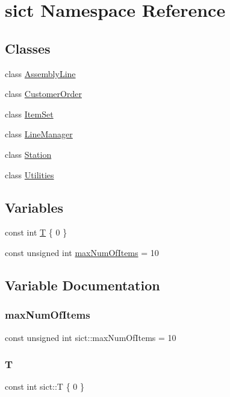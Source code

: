 \hypertarget{namespacesict}{}\section{sict Namespace Reference}
\label{namespacesict}
\subsection*{Classes}
\begin{DoxyCompactItemize}
\item 
class \mbox{\hyperlink{classsict_1_1AssemblyLine}{Assembly\+Line}}
\item 
class \mbox{\hyperlink{classsict_1_1CustomerOrder}{Customer\+Order}}
\item 
class \mbox{\hyperlink{classsict_1_1ItemSet}{Item\+Set}}
\item 
class \mbox{\hyperlink{classsict_1_1LineManager}{Line\+Manager}}
\item 
class \mbox{\hyperlink{classsict_1_1Station}{Station}}
\item 
class \mbox{\hyperlink{classsict_1_1Utilities}{Utilities}}
\end{DoxyCompactItemize}
\subsection*{Variables}
\begin{DoxyCompactItemize}
\item 
const int \mbox{\hyperlink{namespacesict_a7363d81f08c6be43bd12192a9fe48546}{T}} \{ 0 \}
\item 
const unsigned int \mbox{\hyperlink{namespacesict_a013c6a3783ee25d56c3428256fbea776}{max\+Num\+Of\+Items}} = 10
\end{DoxyCompactItemize}


\subsection{Variable Documentation}
\mbox{\label{namespacesict_a013c6a3783ee25d56c3428256fbea776}} 
\subsubsection{\texorpdfstring{maxNumOfItems}{maxNumOfItems}}
{\footnotesize\ttfamily const unsigned int sict\+::max\+Num\+Of\+Items = 10}

\mbox{\label{namespacesict_a7363d81f08c6be43bd12192a9fe48546}} 
\subsubsection{\texorpdfstring{T}{T}}
{\footnotesize\ttfamily const int sict\+::T \{ 0 \}}

